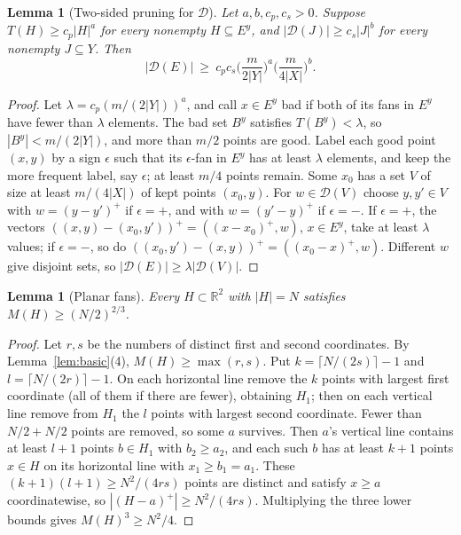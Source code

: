 \documentclass[11pt]{amsart}
\newtheorem{lemma}[theorem]{Lemma}
\theoremstyle{definition}
\theoremstyle{remark}
\newcommand{\R}{\mathbb{R}}
\newcommand{\Dp}{\mathcal{D}}
\newcommand{\Mf}{M}
\newcommand{\Tf}{T}
\begin{document}
\begin{lemma}[Two-sided pruning for $\Dp$]\label{lem:P3}
Let $a,b,c_p,c_s>0$. Suppose $\Tf(H)\ge c_p|H|^a$ for every nonempty $H\subseteq E^y$, and $|\Dp(J)|\ge c_s|J|^b$ for every nonempty $J\subseteq Y$. Then
\[
|\Dp(E)|\ \ge\ c_pc_s\Big(\frac{m}{2|Y|}\Big)^{a}\Big(\frac{m}{4|X|}\Big)^{b}.
\]
\end{lemma}

\begin{proof}
Let $\lambda=c_p(m/(2|Y|))^a$, and call $x\in E^y$ bad if both of its fans in $E^y$ have fewer than $\lambda$ elements. The bad set $B^y$ satisfies $\Tf(B^y)<\lambda$, so $|B^y|<m/(2|Y|)$, and more than $m/2$ points are good. Label each good point $(x,y)$ by a sign $\epsilon$ such that its $\epsilon$-fan in $E^y$ has at least $\lambda$ elements, and keep the more frequent label, say $\epsilon$; at least $m/4$ points remain. Some $x_0$ has a set $V$ of size at least $m/(4|X|)$ of kept points $(x_0,y)$. For $w\in\Dp(V)$ choose $y,y'\in V$ with $w=(y-y')^+$ if $\epsilon=+$, and with $w=(y'-y)^+$ if $\epsilon=-$. If $\epsilon=+$, the vectors $((x,y)-(x_0,y'))^+=((x-x_0)^+,w)$, $x\in E^y$, take at least $\lambda$ values; if $\epsilon=-$, so do $((x_0,y')-(x,y))^+=((x_0-x)^+,w)$. Different $w$ give disjoint sets, so $|\Dp(E)|\ge\lambda|\Dp(V)|$.
\end{proof}

\begin{lemma}[Planar fans]\label{lem:planar}
Every $H\subset\R^2$ with $|H|=N$ satisfies $\Mf(H)\ge(N/2)^{2/3}$.
\end{lemma}

\begin{proof}
Let $r,s$ be the numbers of distinct first and second coordinates. By Lemma~\ref{lem:basic}(4), $\Mf(H)\ge\max(r,s)$. Put $k=\lceil N/(2s)\rceil-1$ and $l=\lceil N/(2r)\rceil-1$. On each horizontal line remove the $k$ points with largest first coordinate (all of them if there are fewer), obtaining $H_1$; then on each vertical line remove from $H_1$ the $l$ points with largest second coordinate. Fewer than $N/2+N/2$ points are removed, so some $a$ survives. Then $a$'s vertical line contains at least $l+1$ points $b\in H_1$ with $b_2\ge a_2$, and each such $b$ has at least $k+1$ points $x\in H$ on its horizontal line with $x_1\ge b_1=a_1$. These $(k+1)(l+1)\ge N^2/(4rs)$ points are distinct and satisfy $x\ge a$ coordinatewise, so $|(H-a)^+|\ge N^2/(4rs)$. Multiplying the three lower bounds gives $\Mf(H)^3\ge N^2/4$.
\end{proof}
\end{document}
